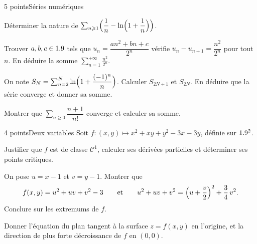 \begin{exoEval}{5 points}{Séries numériques}
\begin{questions}
  \item Déterminer la nature de
    $\sum_{n\geqslant1}\Bigl(\dfrac1n-\ln\Bigl(1+\dfrac1n\Bigr)\Bigr)$.
  \item Trouver $a,b,c\in1.9$ tels que $u_n=\dfrac{an^{2}+bn+c}{2^{n}}$
    vérifie $u_n-u_{n+1}=\dfrac{n^{2}}{2^{n}}$ pour tout $n$. En déduire la
    somme $\sum_{n=1}^{+\infty}\frac{n^{2}}{2^{n}}$.
  \item On note $S_N=\sum_{n=2}^{N}\ln\Bigl(1+\dfrac{(-1)^{n}}{n}\Bigr)$.
    Calculer $S_{2N+1}$ et $S_{2N}$. En déduire que la série converge et
    donner sa somme.
  \item Montrer que $\sum_{n\geqslant0}\dfrac{n+1}{n!}$ converge et calculer
    sa somme.
\end{questions}
\end{exoEval}

\begin{exoEval}{4 points}{Deux variables}
Soit $f:(x,y)\mapsto x^{2}+xy+y^{2}-3x-3y$, définie sur $1.9^{2}$.
\begin{questions}
  \item Justifier que $f$ est de classe $\mathcal{C}^{1}$, calculer ses
    dérivées partielles et déterminer ses points critiques.
  \item On pose $u=x-1$ et $v=y-1$. Montrer que
    \[f(x,y)=u^{2}+uv+v^{2}-3\qquad\text{et}\qquad
      u^{2}+uv+v^{2}=\Bigl(u+\frac v2\Bigr)^{2}+\frac34\,v^{2}.\]
    Conclure sur les extremums de $f$.
  \item Donner l'équation du plan tangent à la surface $z=f(x,y)$ en
    l'origine, et la direction de plus forte décroissance de $f$ en
    $(0,0)$.
\end{questions}
\end{exoEval}
